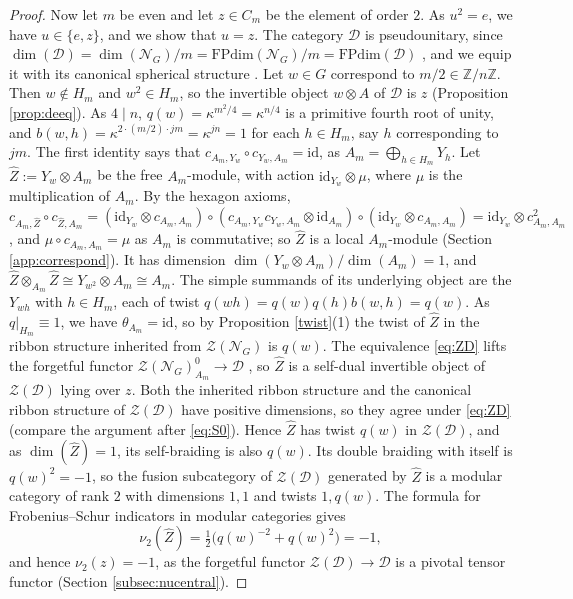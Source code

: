 \documentclass[10pt]{article}
\theoremstyle{plain}
\theoremstyle{definition}
\theoremstyle{plain}
\begin{document}
\begin{proof}
Now let $m$ be even and let $z\in C_m$ be the element of order $2$. As $u^2=e$, we have $u\in\{e,z\}$, and we show that $u=z$. The category $\mathcal{D}$ is pseudounitary, since $\dim(\mathcal{D})=\dim(\mathcal{N}_G)/m=\mathrm{FPdim}(\mathcal{N}_G)/m=\mathrm{FPdim}(\mathcal{D})$ \cite[Proposition 4.26]{MR2609644}, and we equip it with its canonical spherical structure \cite[Proposition 9.5.1]{MR3242743}. Let $w\in G$ correspond to $m/2\in\mathbb{Z}/n\mathbb{Z}$. Then $w\notin H_m$ and $w^2\in H_m$, so the invertible object $w\otimes A$ of $\mathcal{D}$ is $z$ (Proposition \ref{prop:deeq}). As $4\mid n$, $q(w)=\kappa^{m^2/4}=\kappa^{n/4}$ is a primitive fourth root of unity, and $b(w,h)=\kappa^{2\cdot(m/2)\cdot jm}=\kappa^{jn}=1$ for each $h\in H_m$, say $h$ corresponding to $jm$. The first identity says that $c_{A_m,Y_w}\circ c_{Y_w,A_m}=\mathrm{id}$, as $A_m=\bigoplus_{h\in H_m}Y_h$. Let $\widehat{Z}:=Y_w\otimes A_m$ be the free $A_m$-module, with action $\mathrm{id}_{Y_w}\otimes\mu$, where $\mu$ is the multiplication of $A_m$. By the hexagon axioms, $c_{A_m,\widehat{Z}}\circ c_{\widehat{Z},A_m}=(\mathrm{id}_{Y_w}\otimes c_{A_m,A_m})\circ(c_{A_m,Y_w}c_{Y_w,A_m}\otimes\mathrm{id}_{A_m})\circ(\mathrm{id}_{Y_w}\otimes c_{A_m,A_m})=\mathrm{id}_{Y_w}\otimes c_{A_m,A_m}^2$, and $\mu\circ c_{A_m,A_m}=\mu$ as $A_m$ is commutative; so $\widehat{Z}$ is a local $A_m$-module (Section \ref{app:correspond}). It has dimension $\dim(Y_w\otimes A_m)/\dim(A_m)=1$, and $\widehat{Z}\otimes_{A_m}\widehat{Z}\cong Y_{w^2}\otimes A_m\cong A_m$. The simple summands of its underlying object are the $Y_{wh}$ with $h\in H_m$, each of twist $q(wh)=q(w)q(h)b(w,h)=q(w)$. As $q|_{H_m}\equiv1$, we have $\theta_{A_m}=\mathrm{id}$, so by Proposition \ref{twist}(1) the twist of $\widehat{Z}$ in the ribbon structure inherited from $\mathcal{Z}(\mathcal{N}_G)$ is $q(w)$. The equivalence \eqref{eq:ZD} lifts the forgetful functor $\mathcal{Z}(\mathcal{N}_G)^0_{A_m}\to\mathcal{D}$ \cite[(22) and Theorem 3.20]{MR3039775}, so $\widehat{Z}$ is a self-dual invertible object of $\mathcal{Z}(\mathcal{D})$ lying over $z$. Both the inherited ribbon structure and the canonical ribbon structure of $\mathcal{Z}(\mathcal{D})$ have positive dimensions, so they agree under \eqref{eq:ZD} (compare the argument after \eqref{eq:S0}). Hence $\widehat{Z}$ has twist $q(w)$ in $\mathcal{Z}(\mathcal{D})$, and as $\dim(\widehat{Z})=1$, its self-braiding is also $q(w)$. Its double braiding with itself is $q(w)^2=-1$, so the fusion subcategory of $\mathcal{Z}(\mathcal{D})$ generated by $\widehat{Z}$ is a modular category of rank $2$ with dimensions $1,1$ and twists $1,q(w)$. The formula for Frobenius--Schur indicators in modular categories \cite[Theorem 7.5]{MR2313527} gives
\[
\nu_2(\widehat{Z})=\tfrac12\bigl(q(w)^{-2}+q(w)^{2}\bigr)=-1,
\]
and hence $\nu_2(z)=-1$, as the forgetful functor $\mathcal{Z}(\mathcal{D})\to\mathcal{D}$ is a pivotal tensor functor (Section \ref{subsec:nucentral}).


\end{proof}
\end{document}
